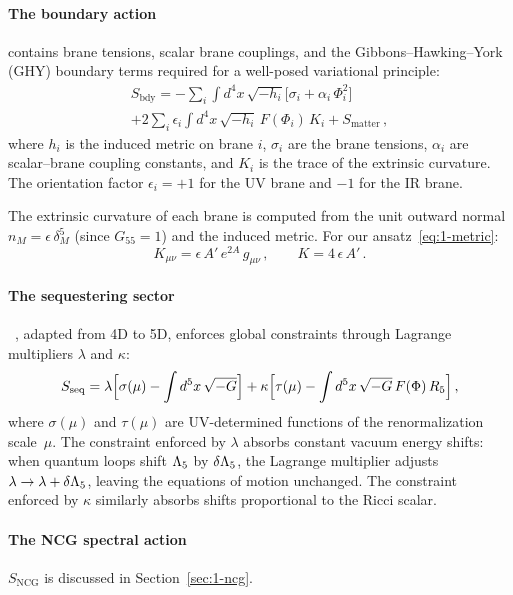 \paragraph{The boundary action} contains brane tensions, scalar brane couplings, and the Gibbons--Hawking--York (GHY) boundary terms required for a well-posed variational principle:
\begin{multline}
\label{eq:1-bdy-action}
S_{\mathrm{bdy}} = -\sum_i \int d^4x\, \sqrt{-h_i}\bigl[\sigma_i + \alpha_i\, \Phi_i^2\bigr] \\
+ 2\sum_i \epsilon_i \int d^4x\, \sqrt{-h_i}\, F(\Phi_i)\, K_i
+ S_{\mathrm{matter}}\,,
\end{multline}
where $h_i$ is the induced metric on brane $i$, $\sigma_i$ are the brane tensions, $\alpha_i$ are scalar--brane coupling constants, and $K_i$ is the trace of the extrinsic curvature. The orientation factor $\epsilon_i = +1$ for the UV brane and $-1$ for the IR brane.

The extrinsic curvature of each brane is computed from the unit outward normal $n_M = \epsilon\, \delta_M^5$ (since $G_{55} = 1$) and the induced metric. For our ansatz~\eqref{eq:1-metric}:
\begin{equation}
\label{eq:1-extrinsic}
K_{\mu\nu} = \epsilon\, A'\, e^{2A}\, g_{\mu\nu}\,, \qquad K = 4\,\epsilon\, A'\,.
\end{equation}

\paragraph{The sequestering sector}~\cite{ch1:kaloper14}, adapted from 4D to 5D, enforces global constraints through Lagrange multipliers $\lambda$ and $\kappa$:
\begin{equation}
\label{eq:1-seq-action}
S_{\mathrm{seq}} = \lambda\Bigl[\sigma(\mu) - \int d^5x\, \sqrt{-G}\Bigr]
+ \kappa\Bigl[\tau(\mu) - \int d^5x\, \sqrt{-G}\, F(\Phi)\, R_5\Bigr]\,,
\end{equation}
where $\sigma(\mu)$ and $\tau(\mu)$ are UV-determined functions of the renormalization scale~$\mu$. The constraint enforced by $\lambda$ absorbs constant vacuum energy shifts: when quantum loops shift $\Lambda_5$ by $\delta\Lambda_5$, the Lagrange multiplier adjusts $\lambda \to \lambda + \delta\Lambda_5$, leaving the equations of motion unchanged. The constraint enforced by $\kappa$ similarly absorbs shifts proportional to the Ricci scalar.

\paragraph{The NCG spectral action} $S_{\mathrm{NCG}}$ is discussed in Section~\ref{sec:1-ncg}.


